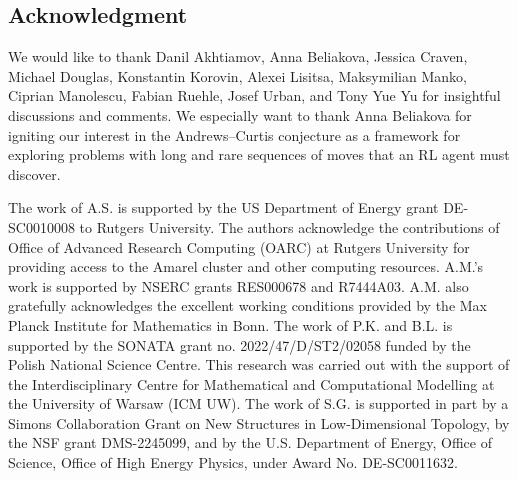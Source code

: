 
\subsection*{Acknowledgment}

We would like to thank Danil Akhtiamov, Anna Beliakova, Jessica Craven, Michael Douglas, Konstantin Korovin, Alexei Lisitsa, Maksymilian Manko, Ciprian Manolescu, Fabian Ruehle, Josef Urban, and Tony Yue Yu for insightful discussions and comments. We especially want to thank Anna Beliakova for igniting our interest in the Andrews--Curtis conjecture as a framework for exploring problems with long and rare sequences of moves that an RL agent must discover.

The work of A.S. is supported by the US Department of Energy grant DE-SC0010008 to Rutgers University. The authors acknowledge the contributions of Office of Advanced Research Computing (OARC) at Rutgers University for providing access to the Amarel cluster and other computing resources.
A.M.'s work is supported by NSERC grants RES000678 and R7444A03. A.M. also gratefully acknowledges the excellent working conditions provided by the Max Planck Institute for Mathematics in Bonn.
The work of P.K. and B.L. is supported by the SONATA grant no. 2022/47/D/ST2/02058 funded by the Polish National Science Centre. This research was carried out with the support of the Interdisciplinary Centre for Mathematical and Computational Modelling at the University of Warsaw (ICM UW).
The work of S.G. is supported in part by a Simons Collaboration Grant on New Structures in Low-Dimensional Topology, by the NSF grant DMS-2245099, and by the U.S. Department of Energy, Office of Science, Office of High Energy Physics, under Award No. DE-SC0011632.
